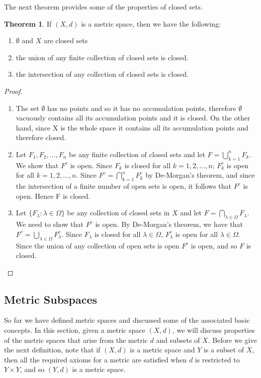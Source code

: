 \documentclass[11pt,a4paper]{article}
\theoremstyle{definition}
\newtheorem{thm}{Theorem}[subsection]
\begin{document}
The next theorem provides some of the properties of closed sets.


\begin{thm}
If $(X,d)$ is a metric space, then we have the following:
\begin{enumerate}
\item[i] $\emptyset$ and $X$ are closed sets
\item[ii] the union of any finite collection of closed sets is closed.
\item[iii] the intersection of any collection of closed sets is closed.
\end{enumerate}
\end{thm}

\begin{proof}
\begin{enumerate}
\item[i] The set $\emptyset$ has no points and so it has no accumulation points, therefore $\emptyset$ vacuously contains all its accumulation points and it is closed. On the other hand, since X is the whole space it contains all its  accumulation points and therefore closed.

\item[ii] Let $F_1,F_2,\ldots,F_n$ be any finite collection of closed sets and let $F=\bigcup^{n}_{k=1} F_k$. We show that $F^c$ is open. Since $F_k$ is closed for all $k=1,2,\ldots,n$; $F^c_k$ is open for all $k=1,2,\ldots,n$. Since $F^c=\bigcap^{n}_{k=1} F_k^c$ by De-Morgan's theorem, and since the intersection of a finite number of open sets is open, it follows that $F^c$ is open. Hence F is closed.

\item[iii] Let $\{F_{\lambda}:\lambda \in \Omega\}$ be any collection of closed sets in $X$ and let $F=\bigcap_{\lambda \in \Omega} F_{\lambda}$. We need to show that $F^c$ is open. By De-Morgan's theorem, we have that $F^c=\bigcup_{\lambda \in \Omega} F^c_{\lambda}$. Since $F_{\lambda}$ is closed for all $\lambda \in \Omega$, $F^c_{\lambda}$ is open for all $\lambda \in \Omega$. Since the union of any collection of open sets is open $F^c$ is open, and so $F$ is closed.
\end{enumerate}
\end{proof}




\subsection{Metric Subspaces}
So far we have defined metric spaces and discussed some of the associated basic concepts. In this section, given a metric space $(X,d)$, we will discuss properties of the metric spaces that arise from the metric $d$ and subsets of $X$. Before we give the next definition, note that if $(X,d)$ is a metric space and $Y$ is a subset of $X$, then all the required axioms for a metric are satisfied when $d$ is restricted to $Y\times Y$, and so $(Y,d)$ is a metric space.
\end{document}

